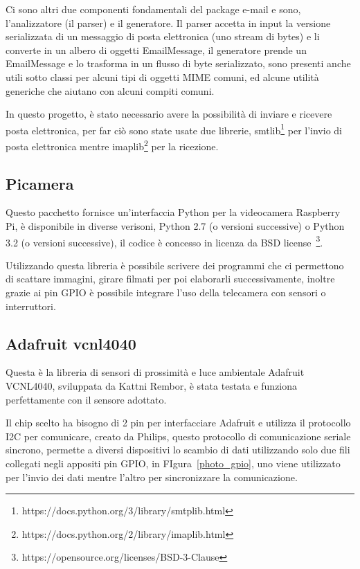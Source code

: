 Ci sono altri due componenti fondamentali del package e-mail e sono, l'analizzatore (il parser) e il generatore.
Il parser accetta in input la versione serializzata di un messaggio di posta elettronica (uno stream di bytes) e li converte in un albero di oggetti EmailMessage,
il generatore prende un EmailMessage e lo trasforma in un flusso di byte serializzato, sono presenti anche utili sotto classi per alcuni tipi di oggetti MIME comuni, 
ed alcune utilità generiche che aiutano con alcuni compiti comuni.

In questo progetto, è stato necessario avere la possibilità di inviare e 
ricevere posta elettronica, per far ciò sono state usate due librerie, smtlib\footnote{https://docs.python.org/3/library/smtplib.html} per l'invio di posta elettronica
mentre imaplib\footnote{https://docs.python.org/2/library/imaplib.html} per la ricezione.

\subsection{Picamera}
Questo pacchetto fornisce un'interfaccia Python per la videocamera Raspberry Pi, è disponibile in diverse verisoni, Python 2.7 (o versioni successive) 
o Python 3.2 (o versioni successive), il codice è concesso in licenza da BSD license~\footnote{https://opensource.org/licenses/BSD-3-Clause}.

Utilizzando questa libreria è possibile scrivere dei programmi che ci permettono di scattare immagini, girare filmati per poi elaborarli successivamente, 
inoltre grazie ai pin GPIO è possibile integrare l’uso della telecamera con sensori o interruttori.

\subsection{Adafruit vcnl4040}

Questa è la libreria di sensori di prossimità e luce ambientale Adafruit VCNL4040, sviluppata da Kattni Rembor, è stata testata e funziona perfettamente con 
il sensore adottato.

Il chip scelto ha bisogno di 2 pin per interfacciare Adafruit e utilizza il protocollo I2C per comunicare, creato da Philips, 
questo protocollo di comunicazione seriale sincrono, permette a diversi dispositivi lo scambio di dati utilizzando solo due fili collegati negli appositi pin GPIO,
in FIgura~\ref{photo_gpio}, uno viene utilizzato per l'invio dei dati mentre l'altro per sincronizzare la comunicazione.
 
